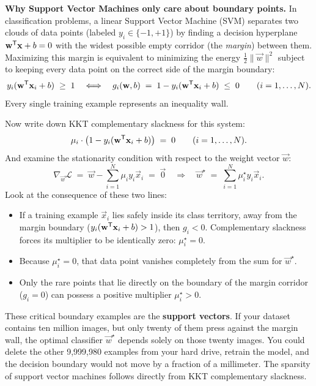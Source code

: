\begin{applicationbox}
\textbf{Why Support Vector Machines only care about boundary points.}
In classification problems, a linear Support Vector Machine (SVM) separates two clouds of data points (labeled $y_i \in \{-1, +1\}$) by finding a decision hyperplane $\mathbf{w}^{\mathsf{T}}\mathbf{x} + b = 0$ with the widest possible empty corridor (the \emph{margin}) between them. Maximizing this margin is equivalent to minimizing the energy $\tfrac12 \|\vec{w}\|^2$ subject to keeping every data point on the correct side of the margin boundary:
\[
  y_i(\mathbf{w}^{\mathsf{T}}\mathbf{x}_i + b) \;\ge\; 1 \quad\Longleftrightarrow\quad g_i(\mathbf{w}, b) \;=\; 1 - y_i(\mathbf{w}^{\mathsf{T}}\mathbf{x}_i + b) \;\le\; 0 \qquad (i = 1, \dots, N).
\]
Every single training example represents an inequality wall.

Now write down KKT complementary slackness for this system:
\[
  \mu_i \cdot \big(1 - y_i(\mathbf{w}^{\mathsf{T}}\mathbf{x}_i + b)\big) \;=\; 0 \qquad (i = 1, \dots, N).
\]
And examine the stationarity condition with respect to the weight vector $\vec{w}$:
\[
  \nabla_{\vec{w}} \mathcal{L} \;=\; \vec{w} - \sum_{i=1}^N \mu_i y_i \vec{x}_i \;=\; \vec{0}
  \quad\Longrightarrow\quad \vec{w}^\star \;=\; \sum_{i=1}^N \mu_i^\star y_i \vec{x}_i.
\]
Look at the consequence of these two lines:
\begin{itemize}
  \item If a training example $\vec{x}_i$ lies safely inside its class territory, away from the margin boundary ($y_i(\mathbf{w}^{\mathsf{T}}\mathbf{x}_i + b) > 1$), then $g_i < 0$. Complementary slackness forces its multiplier to be identically zero: $\mu_i^\star = 0$.
  \item Because $\mu_i^\star = 0$, that data point vanishes completely from the sum for $\vec{w}^\star$.
  \item Only the rare points that lie directly on the boundary of the margin corridor ($g_i = 0$) can possess a positive multiplier $\mu_i^\star > 0$.
\end{itemize}
These critical boundary examples are the \textbf{support vectors}. If your dataset contains ten million images, but only twenty of them press against the margin wall, the optimal classifier $\vec{w}^\star$ depends solely on those twenty images. You could delete the other 9,999,980 examples from your hard drive, retrain the model, and the decision boundary would not move by a fraction of a millimeter. The sparsity of support vector machines follows directly from KKT complementary slackness.
\end{applicationbox}

